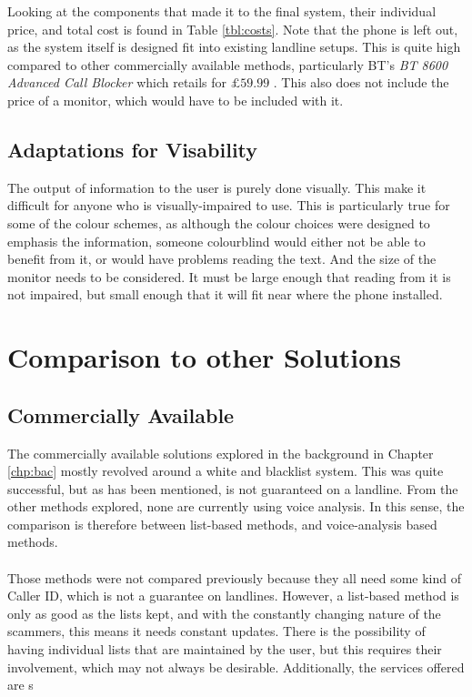 \documentclass[main.tex]{subfiles}
\begin{document}
Looking at the components that made it to the final system, their individual price, and total cost is found in Table \ref{tbl:costs}. Note that the phone is left out, as the system itself is designed fit into existing landline setups.
This is quite high compared to other commercially available methods, particularly BT's \textit{BT 8600 Advanced Call Blocker} which retails for $\pounds 59.99$ \cite{bt-block}. This also does not include the price of a monitor, which would have to be included with it.

\subsection{Adaptations for Visability}

The output of information to the user is purely done visually. This make it difficult for anyone who is visually-impaired to use. This is particularly true for some of the colour schemes, as although the colour choices were designed to emphasis the information, someone colourblind would either not be able to benefit from it, or would have problems reading the text. And the size of the monitor needs to be considered. It must be large enough that reading from it is not impaired, but small enough that it will fit near where the phone installed.

\section{Comparison to other Solutions}
\subsection{Commercially Available}
The commercially available solutions explored in the background in Chapter \ref{chp:bac} mostly revolved around a white and blacklist system. This was quite successful, but as has been mentioned, is not guaranteed on a landline. From the other methods explored, none are currently using voice analysis. In this sense, the comparison is therefore between list-based methods, and voice-analysis based methods.
\\\\
Those methods were not compared previously because they all need some kind of Caller ID, which is not a guarantee on landlines. However, a list-based method is only as good as the lists kept, and with the constantly changing nature of the scammers, this means it needs constant updates. There is the possibility of having individual lists that are maintained by the user, but this requires their involvement, which may not always be desirable. Additionally, the services offered are s 
\end{document}
